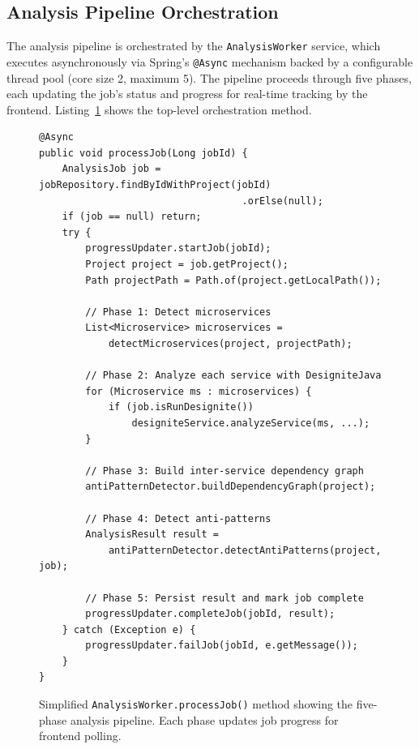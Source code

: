 \subsection{Analysis Pipeline Orchestration}
\label{subsec: analysis-pipeline}

 \par The analysis pipeline is orchestrated by the \texttt{AnalysisWorker} service, which executes asynchronously via Spring's \texttt{@Async} mechanism backed by a configurable thread pool (core size 2, maximum 5). The pipeline proceeds through five phases, each updating the job's status and progress for real-time tracking by the frontend. Listing~\ref{lst:analysis-worker} shows the top-level orchestration method.

\begin{figure}[htbp]
    \begin{verbatim}
@Async
public void processJob(Long jobId) {
    AnalysisJob job = jobRepository.findByIdWithProject(jobId)
                                   .orElse(null);
    if (job == null) return;
    try {
        progressUpdater.startJob(jobId);
        Project project = job.getProject();
        Path projectPath = Path.of(project.getLocalPath());

        // Phase 1: Detect microservices
        List<Microservice> microservices =
            detectMicroservices(project, projectPath);

        // Phase 2: Analyze each service with DesigniteJava
        for (Microservice ms : microservices) {
            if (job.isRunDesignite())
                designiteService.analyzeService(ms, ...);
        }

        // Phase 3: Build inter-service dependency graph
        antiPatternDetector.buildDependencyGraph(project);

        // Phase 4: Detect anti-patterns
        AnalysisResult result =
            antiPatternDetector.detectAntiPatterns(project, job);

        // Phase 5: Persist result and mark job complete
        progressUpdater.completeJob(jobId, result);
    } catch (Exception e) {
        progressUpdater.failJob(jobId, e.getMessage());
    }
}
    \end{verbatim}
    \caption{Simplified \texttt{AnalysisWorker.processJob()} method showing the five-phase analysis pipeline. Each phase updates job progress for frontend polling.}
    \label{lst:analysis-worker}
\end{figure}


